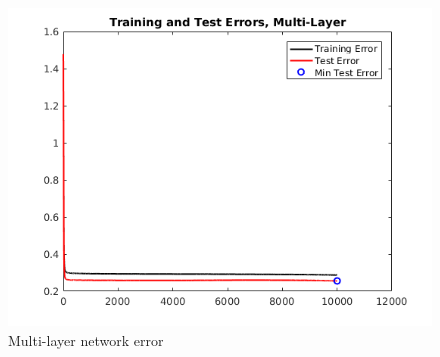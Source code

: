 \documentclass[a4paper,12pt]{article}
\begin{document}
\begin{figure}[H]
\centering
  \begin{minipage}[]{1\textwidth}
  \caption{Multi-layer network error}\label{fig:non_generalizable_error}
  \includegraphics[width=\textwidth]{figures/non_generalizable_test.png}
  \end{minipage}
\end{figure}
\end{document}

